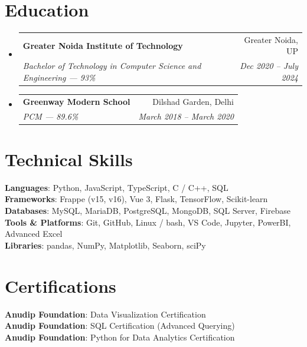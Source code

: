 \documentclass[letterpaper,11pt]{article}
\makeatletter
\newcommand{\resumeSubheading}[4]{%
  \vspace{-2pt}\item
    \begin{tabular*}{0.97\textwidth}[t]{l@{\extracolsep{\fill}}r}
      \textbf{#1} & #2 \\
      \textit{\small#3} & \textit{\small #4} \\
    \end{tabular*}\vspace{-7pt}%
}
\newcommand{\resumeSubHeadingListStart}{\begin{itemize}[leftmargin=0.15in, label={}]}
\newcommand{\resumeSubHeadingListEnd}{\end{itemize}}
\makeatother
\begin{document}
\section{Education}
  \resumeSubHeadingListStart
    \resumeSubheading
      {Greater Noida Institute of Technology}{Greater Noida, UP}
      {Bachelor of Technology in Computer Science and Engineering --- 93\%}{Dec 2020 -- July 2024}

    \resumeSubheading
      {Greenway Modern School}{Dilshad Garden, Delhi}
      {PCM --- 89.6\%}{March 2018 -- March 2020}
  \resumeSubHeadingListEnd

\section{Technical Skills}
 \begin{itemize}[leftmargin=0.15in, label={}]
    \small{\item{
     \textbf{Languages}{: Python, JavaScript, TypeScript, C / C++, SQL} \\
     \textbf{Frameworks}{: Frappe (v15, v16), Vue 3, Flask, TensorFlow, Scikit-learn} \\
     \textbf{Databases}{: MySQL, MariaDB, PostgreSQL, MongoDB, SQL Server, Firebase} \\
     \textbf{Tools \& Platforms}{: Git, GitHub, Linux / bash, VS Code, Jupyter, PowerBI, Advanced Excel} \\
     \textbf{Libraries}{: pandas, NumPy, Matplotlib, Seaborn, sciPy}
    }}
 \end{itemize}

\section{Certifications}
 \begin{itemize}[leftmargin=0.15in, label={}]
    \small{\item{
     \textbf{Anudip Foundation}: Data Visualization Certification \\
     \textbf{Anudip Foundation}: SQL Certification (Advanced Querying) \\
     \textbf{Anudip Foundation}: Python for Data Analytics Certification
    }}
 \end{itemize}
\end{document}

